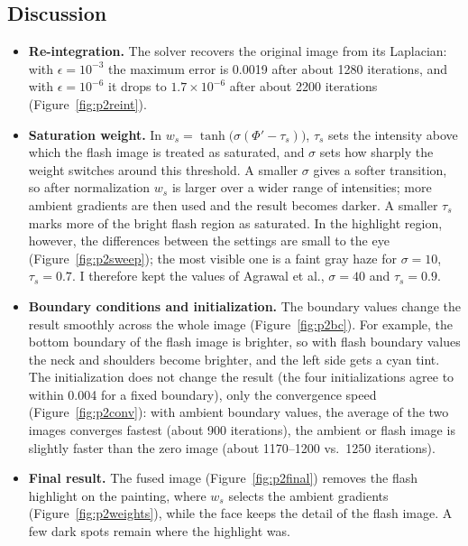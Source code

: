 \documentclass[11pt]{article}
\begin{document}
\subsection*{Discussion}
\begin{itemize}\setlength{\itemsep}{2pt}
\item \textbf{Re-integration.} The solver recovers the original image from its Laplacian: with $\epsilon=10^{-3}$ the maximum error is 0.0019 after about 1280 iterations, and with $\epsilon=10^{-6}$ it drops to $1.7\times10^{-6}$ after about 2200 iterations (Figure~\ref{fig:p2reint}).

\item \textbf{Saturation weight.} In $w_s=\tanh\big(\sigma(\Phi'-\tau_s)\big)$, $\tau_s$ sets the intensity above which the flash image is treated as saturated, and $\sigma$ sets how sharply the weight switches around this threshold. A smaller $\sigma$ gives a softer transition, so after normalization $w_s$ is larger over a wider range of intensities; more ambient gradients are then used and the result becomes darker. A smaller $\tau_s$ marks more of the bright flash region as saturated. In the highlight region, however, the differences between the settings are small to the eye (Figure~\ref{fig:p2sweep}); the most visible one is a faint gray haze for $\sigma=10$, $\tau_s=0.7$. I therefore kept the values of Agrawal et al., $\sigma=40$ and $\tau_s=0.9$.

\item \textbf{Boundary conditions and initialization.} The boundary values change the result smoothly across the whole image (Figure~\ref{fig:p2bc}). For example, the bottom boundary of the flash image is brighter, so with flash boundary values the neck and shoulders become brighter, and the left side gets a cyan tint. The initialization does not change the result (the four initializations agree to within 0.004 for a fixed boundary), only the convergence speed (Figure~\ref{fig:p2conv}): with ambient boundary values, the average of the two images converges fastest (about 900 iterations), the ambient or flash image is slightly faster than the zero image (about 1170--1200 vs.\ 1250 iterations).

\item \textbf{Final result.} The fused image (Figure~\ref{fig:p2final}) removes the flash highlight on the painting, where $w_s$ selects the ambient gradients (Figure~\ref{fig:p2weights}), while the face keeps the detail of the flash image. A few dark spots remain where the highlight was.
\end{itemize}
\end{document}
